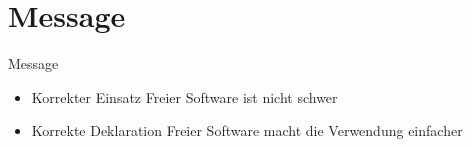 \section{Message}

\begin{frame}{Message}
	\begin{itemize}
		\item Korrekter Einsatz Freier Software ist nicht schwer
		\item Korrekte Deklaration Freier Software macht die Verwendung einfacher
	\end{itemize}
\end{frame}
